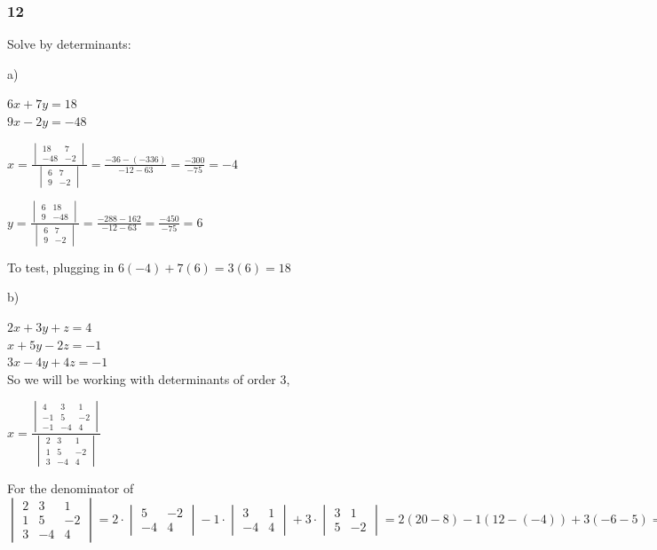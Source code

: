 \documentclass[]{report}
\begin{document}
\subsubsection{12}

Solve by determinants:

a)

$6x + 7y = 18$ \\
$9x - 2y = -48$

$x = \frac{
\begin{vmatrix}
18  & 7\\
-48 & -2
\end{vmatrix}
}{
\begin{vmatrix}
6 & 7 \\
9 & -2
\end{vmatrix}
} = \frac{-36 - (-336)}{-12 - 63} = \frac{-300}{-75} = -4$

$y = \frac{
	\begin{vmatrix}
	6  & 18\\
	9 & -48
	\end{vmatrix}
}{
	\begin{vmatrix}
	6 & 7 \\
	9 & -2
	\end{vmatrix}
} = \frac{-288 - 162}{-12 - 63} = \frac{-450}{-75} = 6$

To test, plugging in $6(-4) + 7(6) = 3(6) =  18$


b)

$2x + 3y + z = 4$ \\
$x + 5y - 2z = -1$ \\
$3x - 4y + 4z = -1$ \\

So we will be working with determinants of order 3,


$x = \frac{
\begin{vmatrix}
4 & 3 & 1\\
-1 & 5 & -2 \\
-1 & -4 & 4
\end{vmatrix}
}{
\begin{vmatrix}
2 & 3 & 1\\
1 &  5 & -2 \\
3 & -4 & 4
\end{vmatrix}
}$

For the denominator of $
\begin{vmatrix}
2 & 3 & 1\\
1 &  5 & -2 \\
3 & -4 & 4
\end{vmatrix} = 2 \cdot \begin{vmatrix}
5 & -2 \\
-4 & 4
\end{vmatrix} 
- 1 \cdot \begin{vmatrix}
3 & 1 \\
-4 & 4
\end{vmatrix}
+ 3 \cdot \begin{vmatrix}
3 & 1 \\
5 & -2
\end{vmatrix} = 2(20 - 8) - 1(12 - (-4)) + 3(-6 - 5) = 2(12) - 1(16) + 3(-11) = 24 - 16 - 33 = -25
$
\end{document}
